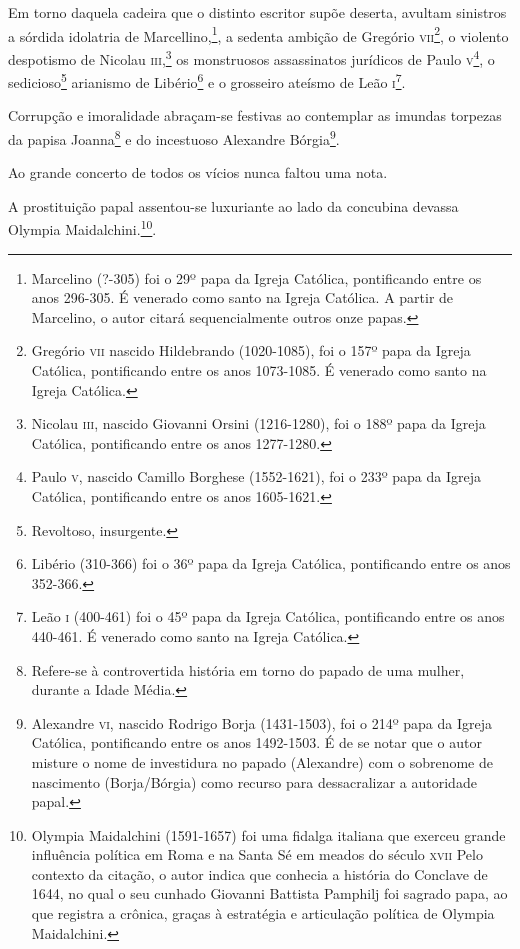 Em torno daquela cadeira que o distinto escritor supõe deserta, avultam
sinistros a sórdida idolatria de Marcellino,\footnote{Marcelino (?-305)
  foi o 29º papa da Igreja Católica, pontificando entre os anos 296-305.
  É venerado como santo na Igreja Católica. A partir de Marcelino, o
  autor citará sequencialmente outros onze papas.}, a sedenta ambição de
Gregório \textsc{vii}\footnote{Gregório \textsc{vii} nascido Hildebrando (1020-1085),
  foi o 157º papa da Igreja Católica, pontificando entre os anos
  1073-1085. É venerado como santo na Igreja Católica.}, o violento
despotismo de Nicolau \textsc{iii},\footnote{Nicolau \textsc{iii}, nascido Giovanni
  Orsini (1216-1280), foi o 188º papa da Igreja Católica, pontificando
  entre os anos 1277-1280.} os monstruosos assassinatos jurídicos de
Paulo \textsc{v}\footnote{Paulo \textsc{v}, nascido Camillo Borghese (1552-1621), foi o
  233º papa da Igreja Católica, pontificando entre os anos 1605-1621.},
o sedicioso\footnote{Revoltoso, insurgente.} arianismo de
Libério\footnote{Libério (310-366) foi o 36º papa da Igreja Católica,
  pontificando entre os anos 352-366.} e o grosseiro ateísmo de
Leão \textsc{i}\footnote{Leão \textsc{i} (400-461) foi o 45º papa da Igreja Católica,
  pontificando entre os anos 440-461. É venerado como santo na Igreja
  Católica.}.

Corrupção e imoralidade abraçam-se festivas ao contemplar as imundas
torpezas da papisa Joanna\footnote{Refere-se à controvertida história
  em torno do papado de uma mulher, durante a Idade Média.} e do
incestuoso Alexandre Bórgia\footnote{Alexandre \textsc{vi}, nascido Rodrigo
  Borja (1431-1503), foi o 214º papa da Igreja Católica, pontificando
  entre os anos 1492-1503. É de se notar que o autor misture o nome de
  investidura no papado (Alexandre) com o sobrenome de nascimento
  (Borja/Bórgia) como recurso para dessacralizar a autoridade papal.}.

Ao grande concerto de todos os vícios nunca faltou uma nota.

A prostituição papal assentou-se luxuriante ao lado da concubina devassa
Olympia Maidalchini.\footnote{Olympia Maidalchini (1591-1657) foi uma
  fidalga italiana que exerceu grande influência política em Roma e na
  Santa Sé em meados do século \textsc{xvii} Pelo contexto da citação, o autor
  indica que conhecia a história do Conclave de 1644, no qual o seu
  cunhado Giovanni Battista Pamphilj foi sagrado papa, ao que registra a
  crônica, graças à estratégia e articulação política de Olympia
  Maidalchini.}.

